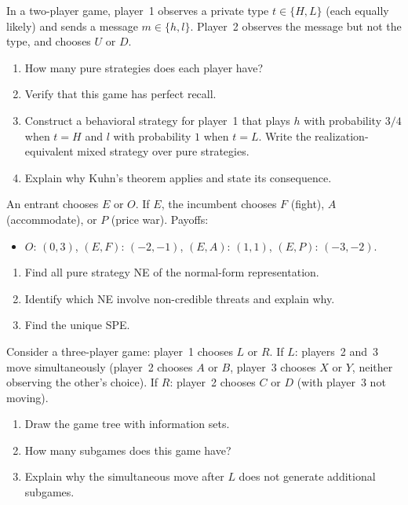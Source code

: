 \documentclass[11pt,a4paper]{article}
\begin{document}
\begin{exercise}
\label{ex:kuhn_verify}
In a two-player game, player~1 observes a private type $t \in \{H, L\}$
(each equally likely) and sends a message $m \in \{h, l\}$. Player~2
observes the message but not the type, and chooses $U$ or $D$.
\begin{enumerate}[nosep,label=(\alph*)]
    \item How many pure strategies does each player have?
    \item Verify that this game has perfect recall.
    \item Construct a behavioral strategy for player~1 that plays $h$ with
    probability $3/4$ when $t = H$ and $l$ with probability $1$ when $t = L$.
    Write the realization-equivalent mixed strategy over pure strategies.
    \item Explain why Kuhn's theorem applies and state its consequence.
\end{enumerate}
\end{exercise}

\begin{exercise}
\label{ex:noncredible_rich}
An entrant chooses $E$ or $O$. If $E$, the incumbent chooses $F$
(fight), $A$ (accommodate), or $P$ (price war). Payoffs:
\begin{itemize}[nosep]
    \item $O$: $(0, 3)$, \quad $(E, F)$: $(-2, -1)$, \quad $(E, A)$: $(1, 1)$,
    \quad $(E, P)$: $(-3, -2)$.
\end{itemize}
\begin{enumerate}[nosep,label=(\alph*)]
    \item Find all pure strategy NE of the normal-form representation.
    \item Identify which NE involve non-credible threats and explain why.
    \item Find the unique SPE.
\end{enumerate}
\end{exercise}

\begin{exercise}
\label{ex:subgame_count}
Consider a three-player game: player~1 chooses $L$ or $R$. If $L$:
players~2 and~3 move simultaneously (player~2 chooses $A$ or $B$, player~3
chooses $X$ or $Y$, neither observing the other's choice). If $R$: player~2
chooses $C$ or $D$ (with player~3 not moving).
\begin{enumerate}[nosep,label=(\alph*)]
    \item Draw the game tree with information sets.
    \item How many subgames does this game have?
    \item Explain why the simultaneous move after $L$ does not generate
    additional subgames.
\end{enumerate}
\end{exercise}
\end{document}
